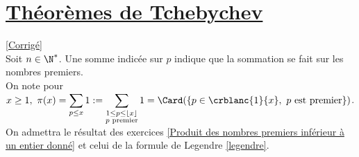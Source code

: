 \documentclass[8pt]{book}
\begin{document}
\section{\underline{Théorèmes de Tchebychev} }
\label{Théorèmes de Tchebychev}
\textcolor{blue}{\hyperref[Théorèmes de Tchebychev corrigé]{[Corrigé]}}\\
Soit $n\in \N^*$. Une somme indicée sur $p$ indique que la sommation se fait sur les nombres premiers.\\
On note pour $x\geq 1,\ \pi(x)=\displaystyle\sum_{p\leq x}1:=\sum_{\substack{1\leq p\leq \lfloor x\rfloor\\p\text{ premier}}}1=\Card(\{p\in \crblanc{1}{x},\ p\text{ est premier}\})$.\\
On admettra le résultat des exercices \ref{Produit des nombres premiers inférieur à un entier donné} et celui de la formule de Legendre \ref{legendre}.
\end{document}
